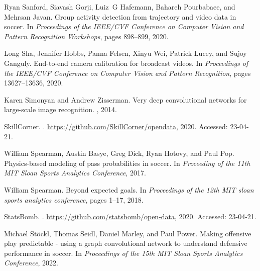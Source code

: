 \documentclass{article}
\begin{document}
\begin{thebibliography}{}
Ryan Sanford, Siavash Gorji, Luiz~G Hafemann, Bahareh Pourbabaee, and Mehrsan
  Javan.
\newblock Group activity detection from trajectory and video data in soccer.
\newblock In {\em Proceedings of the IEEE/CVF Conference on Computer Vision and
  Pattern Recognition Workshops}, pages 898--899, 2020.

Long Sha, Jennifer Hobbs, Panna Felsen, Xinyu Wei, Patrick Lucey, and Sujoy
  Ganguly.
\newblock End-to-end camera calibration for broadcast videos.
\newblock In {\em Proceedings of the IEEE/CVF Conference on Computer Vision and
  Pattern Recognition}, pages 13627--13636, 2020.

Karen Simonyan and Andrew Zisserman.
\newblock Very deep convolutional networks for large-scale image recognition.
, 2014.

SkillCorner.
.
\newblock \url{https://github.com/SkillCorner/opendata}, 2020.
\newblock Accessed: 23-04-21.

William Spearman, Austin Basye, Greg Dick, Ryan Hotovy, and Paul Pop.
\newblock Physics-based modeling of pass probabilities in soccer.
\newblock In {\em Proceeding of the 11th MIT Sloan Sports Analytics
  Conference}, 2017.

William Spearman.
\newblock Beyond expected goals.
\newblock In {\em Proceedings of the 12th MIT sloan sports analytics
  conference}, pages 1--17, 2018.

StatsBomb.
.
\newblock \url{https://github.com/statsbomb/open-data}, 2020.
\newblock Accessed: 23-04-21.

Michael Stöckl, Thomas Seidl, Daniel Marley, and Paul Power.
\newblock Making offensive play predictable - using a graph convolutional
  network to understand defensive performance in soccer.
\newblock In {\em Proceedings of the 15th MIT Sloan Sports Analytics
  Conference}, 2022.


\end{thebibliography}
\end{document}
